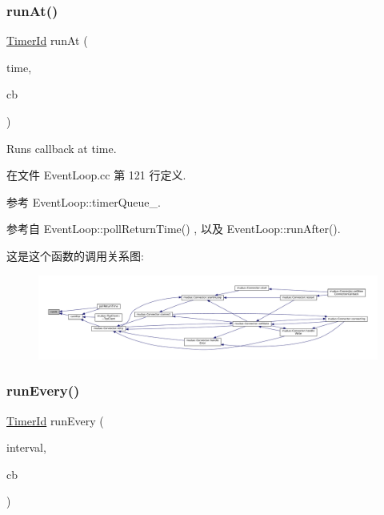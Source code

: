 \subsubsection{\texorpdfstring{run\+At()}{runAt()}}
{\footnotesize\ttfamily \hyperlink{classmuduo_1_1TimerId}{Timer\+Id} run\+At (\begin{DoxyParamCaption}\item[{const \hyperlink{classmuduo_1_1Timestamp}{Timestamp} \&}]{time,  }\item[{const \hyperlink{namespacemuduo_a5f7453c2a15825e79bddf5deaec707bf}{Timer\+Callback} \&}]{cb }\end{DoxyParamCaption})}

Runs callback at \textquotesingle{}time\textquotesingle{}. 

在文件 Event\+Loop.\+cc 第 121 行定义.



参考 Event\+Loop\+::timer\+Queue\+\_\+.



参考自 Event\+Loop\+::poll\+Return\+Time() , 以及 Event\+Loop\+::run\+After().

这是这个函数的调用关系图\+:
\nopagebreak
\begin{figure}[H]
\begin{center}
\leavevmode
\includegraphics[width=350pt]{classmuduo_1_1EventLoop_aa4a2472f0030a6f2076aa56e21830f6f_icgraph}
\end{center}
\end{figure}
\mbox{\label{classmuduo_1_1EventLoop_a7bf9fa6b9440ac1053f475108297264e}} 
\subsubsection{\texorpdfstring{run\+Every()}{runEvery()}}
{\footnotesize\ttfamily \hyperlink{classmuduo_1_1TimerId}{Timer\+Id} run\+Every (\begin{DoxyParamCaption}\item[{double}]{interval,  }\item[{const \hyperlink{namespacemuduo_a5f7453c2a15825e79bddf5deaec707bf}{Timer\+Callback} \&}]{cb }\end{DoxyParamCaption})}

